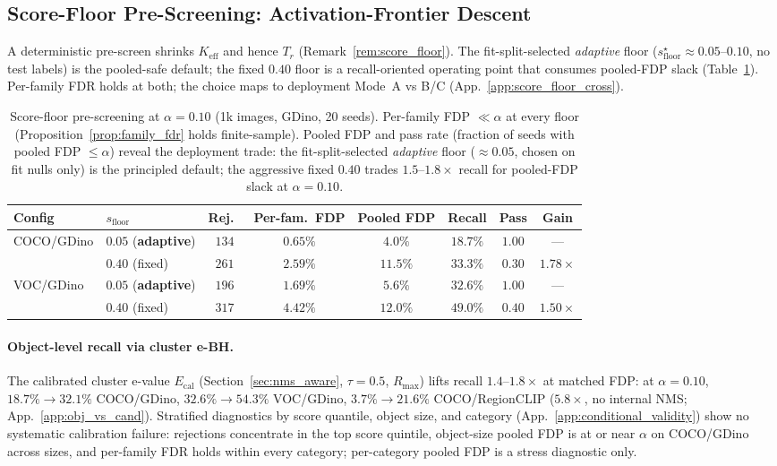 \documentclass{article}
\theoremstyle{remark}
\newcommand{\1}{\mathbf{1}}
\begin{document}
\subsection{Score-Floor Pre-Screening: Activation-Frontier Descent}
\label{sec:score_floor_exp}

A deterministic pre-screen shrinks $K_{\mathrm{eff}}$ and hence $T_r$
(Remark~\ref{rem:score_floor}). The fit-split-selected \emph{adaptive}
floor ($s_{\mathrm{floor}}^{\star}\!\approx\!0.05$--$0.10$, no test
labels) is the pooled-safe default; the fixed $0.40$ floor is a
recall-oriented operating point that consumes pooled-FDP slack
(Table~\ref{tab:score_floor}). Per-family FDR holds at both; the
choice maps to deployment Mode~A vs B/C
(App.~\ref{app:score_floor_cross}).

\begin{table}[t]
\centering
\small
\begin{tabular*}{\linewidth}{@{\extracolsep{\fill}}llcccccc@{}}
\toprule
Config & $s_{\mathrm{floor}}$ & Rej.\ & Per-fam.\ FDP & Pooled FDP & Recall & Pass & Gain \\
\midrule
\multirow{2}{*}{COCO/GDino}
& $0.05$ (\textbf{adaptive})& $134$ & $0.65\%$ & $4.0\%$  & $18.7\%$ & $1.00$ & --- \\
& $0.40$ (fixed)            & $261$ & $2.59\%$ & $11.5\%$ & $33.3\%$ & $0.30$ & $1.78\times$ \\
\midrule
\multirow{2}{*}{VOC/GDino}
& $0.05$ (\textbf{adaptive})& $196$ & $1.69\%$ & $5.6\%$  & $32.6\%$ & $1.00$ & --- \\
& $0.40$ (fixed)            & $317$ & $4.42\%$ & $12.0\%$ & $49.0\%$ & $0.40$ & $1.50\times$ \\
\bottomrule
\end{tabular*}
\caption{Score-floor pre-screening at $\alpha=0.10$ (1k images, GDino,
20 seeds). Per-family FDP $\ll\alpha$ at every floor (Proposition~\ref{prop:family_fdr}
holds finite-sample). Pooled FDP and pass rate (fraction of seeds with
pooled FDP $\le\alpha$) reveal the deployment trade: the
fit-split-selected \emph{adaptive} floor ($\approx\!0.05$, chosen on fit nulls only)
is the principled default; the aggressive fixed $0.40$ trades $1.5$--$1.8\times$
recall for pooled-FDP slack at $\alpha\!=\!0.10$.}
\label{tab:score_floor}
\end{table}

\paragraph{Object-level recall via cluster e-BH.}
The calibrated cluster e-value $E_{\mathrm{cal}}$
(Section~\ref{sec:nms_aware}, $\tau\!=\!0.5$, $R_{\max}$) lifts recall
$1.4$--$1.8\times$ at matched FDP: at $\alpha\!=\!0.10$,
$18.7\%\!\to\!32.1\%$ COCO/GDino, $32.6\%\!\to\!54.3\%$ VOC/GDino,
$3.7\%\!\to\!21.6\%$ COCO/RegionCLIP ($5.8\times$, no internal NMS;
App.~\ref{app:obj_vs_cand}). Stratified diagnostics by score
quantile, object size, and category
(App.~\ref{app:conditional_validity}) show no systematic calibration
failure: rejections concentrate in the top score quintile, object-size
pooled FDP is at or near $\alpha$ on COCO/GDino across sizes, and
per-family FDR holds within every category; per-category pooled FDP
is a stress diagnostic only.
\end{document}
